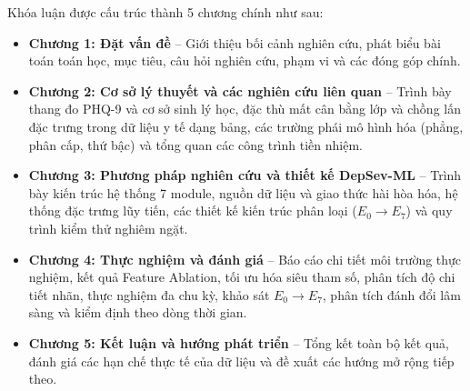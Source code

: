 Khóa luận được cấu trúc thành 5 chương chính như sau:
\begin{itemize}
    \item \textbf{Chương 1: Đặt vấn đề} -- Giới thiệu bối cảnh nghiên cứu, phát biểu bài toán toán học, mục tiêu, câu hỏi nghiên cứu, phạm vi và các đóng góp chính.
    \item \textbf{Chương 2: Cơ sở lý thuyết và các nghiên cứu liên quan} -- Trình bày thang đo PHQ-9 và cơ sở sinh lý học, đặc thù mất cân bằng lớp và chồng lấn đặc trưng trong dữ liệu y tế dạng bảng, các trường phái mô hình hóa (phẳng, phân cấp, thứ bậc) và tổng quan các công trình tiền nhiệm.
    \item \textbf{Chương 3: Phương pháp nghiên cứu và thiết kế DepSev-ML} -- Trình bày kiến trúc hệ thống 7 module, nguồn dữ liệu và giao thức hài hòa hóa, hệ thống đặc trưng lũy tiến, các thiết kế kiến trúc phân loại ($E_0 \to E_7$) và quy trình kiểm thử nghiêm ngặt.
    \item \textbf{Chương 4: Thực nghiệm và đánh giá} -- Báo cáo chi tiết môi trường thực nghiệm, kết quả Feature Ablation, tối ưu hóa siêu tham số, phân tích độ chi tiết nhãn, thực nghiệm đa chu kỳ, khảo sát $E_0 \to E_7$, phân tích đánh đổi lâm sàng và kiểm định theo dòng thời gian.
    \item \textbf{Chương 5: Kết luận và hướng phát triển} -- Tổng kết toàn bộ kết quả, đánh giá các hạn chế thực tế của dữ liệu và đề xuất các hướng mở rộng tiếp theo.
\end{itemize}
